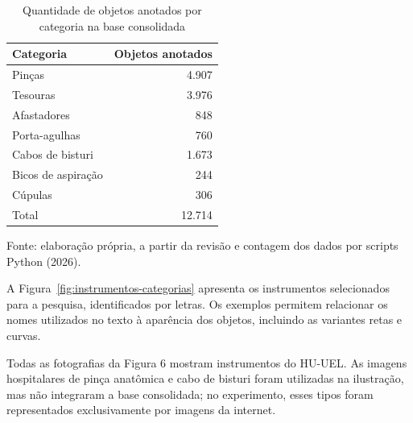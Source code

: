\begin{table}[htbp]
\centering
\begin{minipage}{0.85\linewidth}
\singlespacing\small
\caption{Quantidade de objetos anotados por categoria na base consolidada}
\label{tab:met-taxonomias}
\centering
\begin{tabular}{lr}
\hline
Categoria & Objetos anotados \\
\hline
Pinças & 4.907 \\
Tesouras & 3.976 \\
Afastadores & 848 \\
Porta-agulhas & 760 \\
Cabos de bisturi & 1.673 \\
Bicos de aspiração & 244 \\
Cúpulas & 306 \\
\hline
Total & 12.714 \\
\hline
\end{tabular}\par
\vspace{0.35em}
\raggedright
Fonte: elaboração própria, a partir da revisão e contagem dos dados por scripts Python (2026).
\end{minipage}
\end{table}

A Figura~\ref{fig:instrumentos-categorias} apresenta os instrumentos
selecionados para a pesquisa, identificados por letras. Os exemplos permitem relacionar os nomes utilizados no texto à aparência dos objetos, incluindo as variantes retas e curvas.

Todas as fotografias da Figura 6 mostram instrumentos do HU-UEL. As imagens hospitalares de pinça anatômica e cabo de bisturi foram utilizadas na ilustração, mas não integraram a base consolidada; no experimento, esses tipos foram representados exclusivamente por imagens da internet.

